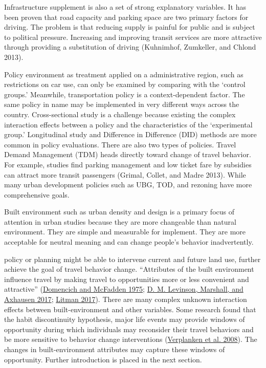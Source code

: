 \documentclass[
  11pt,
  openany]{memoir}
\begin{document}
Infrastructure supplement is also a set of strong explanatory variables. It has been proven that road capacity and parking space are two primary factors for driving. The problem is that reducing supply is painful for public and is subject to political pressure. Increasing and improving transit services are more attractive through providing a substitution of driving (Kuhnimhof, Zumkeller, and Chlond 2013).

Policy environment as treatment applied on a administrative region, such as restrictions on car use, can only be examined by comparing with the `control groups.' Meanwhile, transportation policy is a context-dependent factor. The same policy in name may be implemented in very different ways across the country. Cross-sectional study is a challenge because existing the complex interaction effects between a policy and the characteristics of the `experimental group.' Longitudinal study and Difference in Difference (DID) methods are more common in policy evaluations. There are also two types of policies. Travel Demand Management (TDM) heads directly toward change of travel behavior. For example, studies find parking management and low ticket fare by subsidies can attract more transit passengers (Grimal, Collet, and Madre 2013). While many urban development policies such as UBG, TOD, and rezoning have more comprehensive goals.

Built environment such as urban density and design is a primary focus of attention in urban studies because they are more changeable than natural environment. They are simple and measurable for implement. They are more acceptable for neutral meaning and can change people's behavior inadvertently.

policy or planning might be able to intervene current and future land use, further achieve the goal of travel behavior change. ``Attributes of the built environment influence travel by making travel to opportunities more or less convenient and attractive'' (\protect\hyperlink{ref-domencichURBANTRAVELDEMAND1975}{Domencich and McFadden 1975}; \protect\hyperlink{ref-levinsonElementsAccessTransport2017}{D. M. Levinson, Marshall, and Axhausen 2017}; \protect\hyperlink{ref-litmanHowLandUse2017}{Litman 2017}). There are many complex unknown interaction effects between built-environment and other variables. Some research found that the habit discontinuity hypothesis, major life events may provide windows of opportunity during which individuals may reconsider their travel behaviors and be more sensitive to behavior change interventions (\protect\hyperlink{ref-verplankenContextChangeTravel2008}{Verplanken et al. 2008}). The changes in built-environment attributes may capture these windows of opportunity. Further introduction is placed in the next section.
\end{document}
